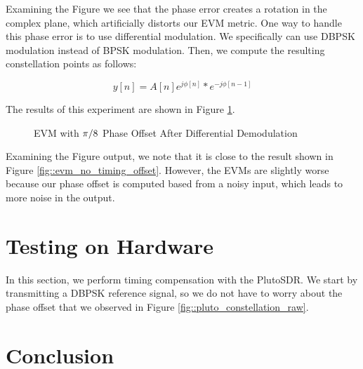\documentclass{article}
\begin{document}
\noindent Examining the Figure we see that the phase error creates a rotation in the complex plane, which artificially distorts our EVM metric. One way to handle this phase error is to use differential modulation. We specifically can use DBPSK modulation instead of BPSK modulation. Then, we compute the resulting constellation points as follows:

\begin{equation}
	y[n] = A[n]e^{j\phi[n]}*e^{-j\phi[n-1]}
\end{equation}

\noindent The results of this experiment are shown in Figure \ref{fig::evm_dpsk_modulation}.

\begin{figure}[H]
	\centerline{}
	\caption{EVM with $\protect\pi/8$ Phase Offset After Differential Demodulation}
	\label{fig::evm_dpsk_modulation}
\end{figure}

\noindent Examining the Figure output, we note that it is close to the result shown in Figure \ref{fig::evm_no_timing_offset}. However, the EVMs are slightly worse because our phase offset is computed based from a noisy input, which leads to more noise in the output.

\section{Testing on Hardware}

In this section, we perform timing compensation with the PlutoSDR. We start by transmitting a DBPSK reference signal, so we do not have to worry about the phase offset that we observed in Figure \ref{fig::pluto_constellation_raw}.

\section{Conclusion}
	
\end{document}
